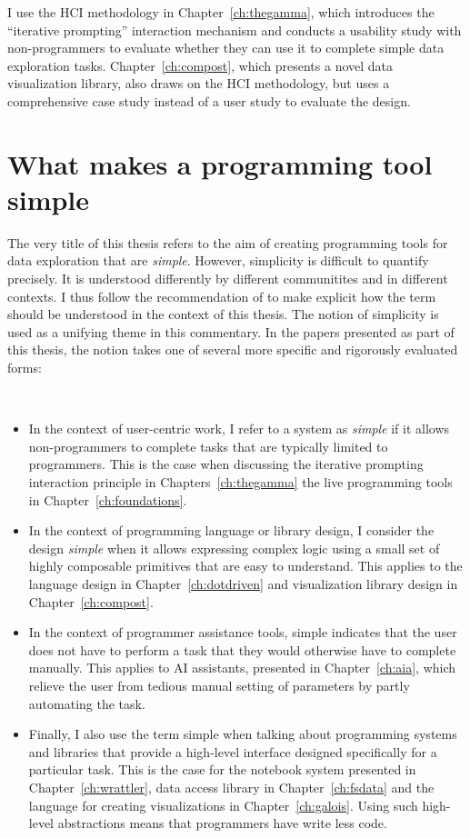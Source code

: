 \documentclass[fleqn,11pt]{report}
\theoremstyle{definition}
\newenvironment{nitemize}
{ \vspace{-0.4em}
  \begin{itemize}
    \setlength{\itemsep}{5pt}
    \setlength{\parskip}{0pt}
    \setlength{\parsep}{0pt} }
{ \end{itemize}
  \vspace{-0.4em} }
\begin{document}
I use the HCI methodology in Chapter~\ref{ch:thegamma}, which introduces the ``iterative prompting''
interaction mechanism and conducts a usability study with non-programmers to evaluate whether
they can use it to complete simple data exploration tasks. Chapter~\ref{ch:compost}, which
presents a novel data visualization library, also draws on the HCI methodology, but uses a
comprehensive case study instead of a user study to evaluate the design.

\section{What makes a programming tool simple}

The very title of this thesis refers to the aim of creating programming tools for data exploration
that are \emph{simple}. However, simplicity is difficult to quantify precisely. It is understood
differently by different communitites and in different contexts. I thus follow the recommendation
of \citet{muller-2020-rhetoric} to make explicit how the term should be understood in the
context of this thesis. The notion of simplicity is used as a unifying theme in this commentary.
In the papers presented as part of this thesis, the notion takes one of several more specific and
rigorously evaluated forms:

~

\begin{nitemize}
\item In the context of user-centric work, I refer to a system as \emph{simple} if it allows
  non-programmers to complete tasks that are typically limited to programmers. This is the
  case when discussing the iterative prompting interaction principle in Chapters~\ref{ch:thegamma}
  the live programming tools in Chapter~\ref{ch:foundations}.

\item In the context of programming language or library design, I consider the design \emph{simple}
  when it allows expressing complex logic using a small set of highly composable primitives
  that are easy to understand. This applies to the language design in Chapter~\ref{ch:dotdriven}
  and visualization library design in Chapter~\ref{ch:compost}.

\item In the context of programmer assistance tools, simple indicates that the
  user does not have to perform a task that they would otherwise have to complete manually.
  This applies to AI assistants, presented in Chapter~\ref{ch:aia}, which relieve the user from
  tedious manual setting of parameters by partly automating the task.

\item Finally, I also use the term simple when talking about programming systems and libraries
  that provide a high-level interface designed specifically for a particular task. This is the
  case for the notebook system presented in Chapter~\ref{ch:wrattler}, data access library
  in Chapter~\ref{ch:fsdata} and the language for creating visualizations in Chapter~\ref{ch:galois}.
  Using such high-level abstractions means that programmers have write less code.
\end{nitemize}
\end{document}
